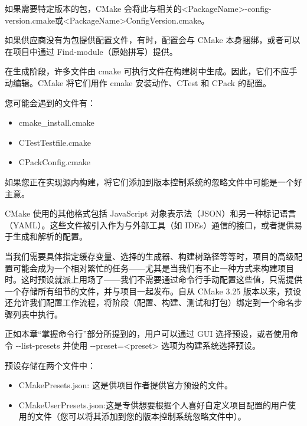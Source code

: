 如果需要特定版本的包，CMake 会将此与相关的<PackageName>-config-version.cmake或<PackageName>ConfigVersion.cmake。

如果供应商没有为包提供配置文件，有时，配置会与 CMake 本身捆绑，或者可以在项目中通过 Find-module（原始拼写）提供。


在生成阶段，许多文件由 cmake 可执行文件在构建树中生成。因此，它们不应手动编辑。CMake 将它们用作 cmake 安装动作、CTest 和 CPack 的配置。

您可能会遇到的文件有：

\begin{itemize}
\item
cmake\_install.cmake

\item
CTestTestfile.cmake

\item
CPackConfig.cmake
\end{itemize}

如果您正在实现源内构建，将它们添加到版本控制系统的忽略文件中可能是一个好主意。


CMake 使用的其他格式包括 JavaScript 对象表示法（JSON）和另一种标记语言（YAML）。这些文件被引入作为与外部工具（如 IDEs）通信的接口，或者提供易于生成和解析的配置。


当我们需要具体指定缓存变量、选择的生成器、构建树路径等等时，项目的高级配置可能会成为一个相对繁忙的任务——尤其是当我们有不止一种方式来构建项目时。这时预设就派上用场了——我们不需要通过命令行手动配置这些值，只需提供一个存储所有细节的文件，并与项目一起发布。自从 CMake 3.25 版本以来，预设还允许我们配置工作流程，将阶段（配置、构建、测试和打包）绑定到一个命名步骤列表中执行。

正如本章“掌握命令行”部分所提到的，用户可以通过 GUI 选择预设，或者使用命令 -{}-list-presets 并使用 -{}-preset=<preset> 选项为构建系统选择预设。

预设存储在两个文件中：

\begin{itemize}
\item
CMakePresets.json: 这是供项目作者提供官方预设的文件。

\item
CMakeUserPresets.json:这是专供想要根据个人喜好自定义项目配置的用户使用的文件（您可以将其添加到您的版本控制系统忽略文件中）。
\end{itemize}

